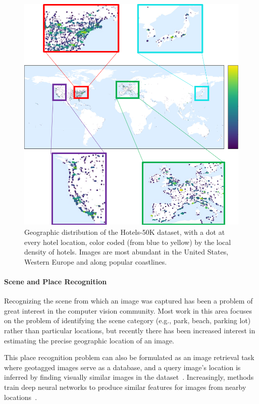 \begin{figure}
    \centering
    \includegraphics[width=.95\columnwidth]{figures/chapter3/geographic_hist/geographic_density2.png}
    \caption{Geographic distribution of the Hotels-50K dataset, with a dot at every hotel location, color coded (from blue to yellow) by the local density of hotels. Images are most abundant in the United States, Western Europe and along popular coastlines. }
    \label{fig:geographicDensity}
\end{figure}

\paragraph{Scene and Place Recognition}
Recognizing the scene from which an image was captured has been a problem of great interest in the computer vision community. Most work in this area focuses on the problem of identifying the scene category (e.g., park, beach, parking lot) rather than particular locations, but recently there has been increased interest in estimating the precise geographic location of an image.

This place recognition problem can also be formulated as an image retrieval task where geotagged images serve as a database, and a query image's location is inferred by finding visually similar images in the dataset~\cite{baatz2012large,chen2011city,crandall2009mapping,hays2008im2gps,jacobs07geolocate,schindler2007city,torii2013visual,zamir2010accurate,googleLandmarks}. Increasingly, methods train deep neural networks to produce similar features for images from nearby locations~\cite{zhou2014recognizing,netvlad,visualPlaceRecognition,vo2017revisit,zhai2018geotemporal}.  

